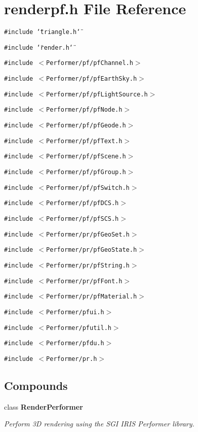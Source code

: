 \section{renderpf.h File Reference}
\label{renderpf_h}
{\tt \#include \char`\"{}triangle.h\char`\"{}}\par
{\tt \#include \char`\"{}render.h\char`\"{}}\par
{\tt \#include $<$Performer/pf/pf\-Channel.h$>$}\par
{\tt \#include $<$Performer/pf/pf\-Earth\-Sky.h$>$}\par
{\tt \#include $<$Performer/pf/pf\-Light\-Source.h$>$}\par
{\tt \#include $<$Performer/pf/pf\-Node.h$>$}\par
{\tt \#include $<$Performer/pf/pf\-Geode.h$>$}\par
{\tt \#include $<$Performer/pf/pf\-Text.h$>$}\par
{\tt \#include $<$Performer/pf/pf\-Scene.h$>$}\par
{\tt \#include $<$Performer/pf/pf\-Group.h$>$}\par
{\tt \#include $<$Performer/pf/pf\-Switch.h$>$}\par
{\tt \#include $<$Performer/pf/pf\-DCS.h$>$}\par
{\tt \#include $<$Performer/pf/pf\-SCS.h$>$}\par
{\tt \#include $<$Performer/pr/pf\-Geo\-Set.h$>$}\par
{\tt \#include $<$Performer/pr/pf\-Geo\-State.h$>$}\par
{\tt \#include $<$Performer/pr/pf\-String.h$>$}\par
{\tt \#include $<$Performer/pr/pf\-Font.h$>$}\par
{\tt \#include $<$Performer/pr/pf\-Material.h$>$}\par
{\tt \#include $<$Performer/pfui.h$>$}\par
{\tt \#include $<$Performer/pfutil.h$>$}\par
{\tt \#include $<$Performer/pfdu.h$>$}\par
{\tt \#include $<$Performer/pr.h$>$}\par
\subsection*{Compounds}
\begin{CompactItemize}
\item 
class {\bf Render\-Performer}
\begin{CompactList}\small\item\em Perform 3D rendering using the SGI IRIS Performer library.\item\end{CompactList}\end{CompactItemize}
